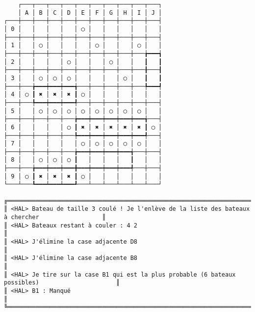 {\scriptsize
\begin{verbatim}
    ┌───┬───┬───┬───┬───┬───┬───┬───┬───┬───┐
    │ A │ B │ C │ D │ E │ F │ G │ H │ I │ J │
┌───┼───┼───┼───┼───┼───┼───┼───┼───┼───┼───┤
│ 0 │   │   │   │   │ ◯ │   │   │   │   │   │
├───┼───┼───┼───┼───┼───┼───┼───┼───┼───┼───┤
│ 1 │   │ ◯ │   │   │   │ ◯ │   │   │ ◯ │   │
├───┼───┼───┼───┼───┼───┼───┼───┼───┼───╆━━━┪
│ 2 │   │   │   │ ◯ │   │   │ ◯ │   │   ┃   ┃
├───┼───┼───┼───┼───┼───┼───┼───┼───┼───╂───┨
│ 3 │   │ ◯ │ ◯ │ ◯ │   │   │   │ ◯ │   ┃   ┃
├───┼───╆━━━┿━━━┿━━━╅───┼───┼───┼───┼───╄━━━┩
│ 4 │ ◯ ┃ ✖ │ ✖ │ ✖ ┃ ◯ │   │   │   │   │   │
├───┼───╄━━━┿━━━┿━━━╃───┼───┼───┼───┼───┼───┤
│ 5 │   │ ◯ │ ◯ │ ◯ │ ◯ │ ◯ │ ◯ │ ◯ │ ◯ │   │
├───┼───┼───┼───┼───╆━━━┿━━━┿━━━┿━━━┿━━━╅───┤
│ 6 │   │   │   │ ◯ ┃ ✖ │ ✖ │ ✖ │ ✖ │ ✖ ┃ ◯ │
├───┼───┼───┼───┼───╄━━━┿━━━┿━━━┿━━━┿━━━╃───┤
│ 7 │   │   │   │   │ ◯ │ ◯ │ ◯ │ ◯ │ ◯ │   │
├───┼───┼───┼───┼───╆━━━┿━━━┿━━━┿━━━╅───┼───┤
│ 8 │   │ ◯ │ ◯ │ ◯ ┃   │   │   │   ┃   │   │
├───┼───╆━━━┿━━━┿━━━╋━━━┿━━━┿━━━┿━━━╃───┼───┤
│ 9 │ ◯ ┃ ✖ │ ✖ │ ✖ ┃ ◯ │   │   │   │   │   │
└───┴───┺━━━┷━━━┷━━━┹───┴───┴───┴───┴───┴───┘

╔══════════════════════════════════════════════════════════════════════════════════════════════════╗
║ <HAL> Bateau de taille 3 coulé ! Je l'enlève de la liste des bateaux à chercher                  ║
║ <HAL> Bateaux restant à couler : 4 2                                                             ║
║ <HAL> J'élimine la case adjacente D8                                                             ║
║ <HAL> J'élimine la case adjacente B8                                                             ║
║ <HAL> Je tire sur la case B1 qui est la plus probable (6 bateaux possibles)                      ║
║ <HAL> B1 : Manqué                                                                                ║
╚══════════════════════════════════════════════════════════════════════════════════════════════════╝
\end{verbatim}}
\newpage

